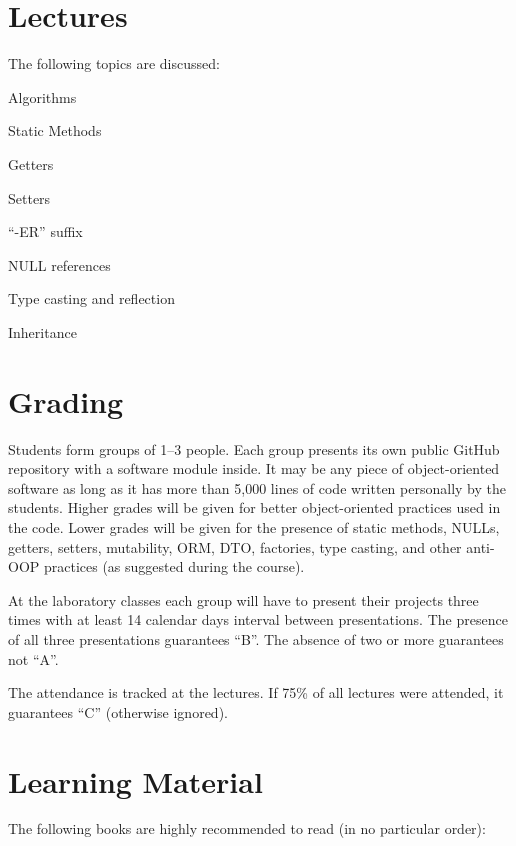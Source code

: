 \documentclass[nobrand,anonymous,nodate,nosecurity]{huawei}
\begin{document}
{\newpage
\section*{Lectures}

The following topics are discussed:

\begin{lectures}
\item Algorithms
\item Static Methods
\item Getters
\item Setters
\item ``-ER'' suffix
\item NULL references
\item Type casting and reflection
\item Inheritance
\end{lectures}

\newpage
\section*{Grading}

Students form groups of 1--3 people. Each group presents
its own public GitHub repository with a software module inside.
It may be any piece of object-oriented software as long as it has more than 5,000 lines
of code written personally by the students.
Higher grades will be given
for better object-oriented practices used in the code. Lower grades will be
given for the presence of static methods, NULLs, getters, setters, mutability,
ORM, DTO, factories, type casting, and other anti-OOP practices (as suggested during the course).

At the laboratory classes each group will have to present
their projects three times with at least 14 calendar days interval between presentations.
The presence of all three presentations guarantees ``B''.
The absence of two or more guarantees not ``A''.

The attendance is tracked at the lectures. If 75\% of all lectures were attended,
it guarantees ``C'' (otherwise ignored).

\newpage
\section*{Learning Material}

The following books are highly recommended to read (in no particular order):

}
\end{document}
